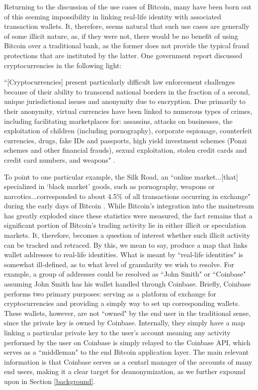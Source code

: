 \documentclass[journal]{IEEEtran}
\begin{document}
Returning to the discussion of the use cases of Bitcoin, many have been born out of this seeming impossibility in linking real-life identity with associated transaction wallets. It, therefore, seems natural that such use cases are generally of some illicit nature, as, if they were not, there would be no benefit of using Bitcoin over a traditional bank, as the former does not provide the typical fraud protections that are instituted by the latter. One government report discussed cryptocurrencies in the following light:

``[Cryptocurrencies] present particularly difficult law enforcement challenges because of their ability to transcend national borders in the fraction of a second, unique jurisdictional issues and anonymity due to encryption. Due primarily to their anonymity, virtual currencies have been linked to numerous types of crimes, including facilitating marketplaces for: assassins, attacks on businesses, the exploitation of children (including pornography), corporate espionage, counterfeit currencies, drugs, fake IDs and passports, high yield investment schemes (Ponzi schemes and other financial frauds), sexual exploitation, stolen credit cards and credit card numbers, and weapons" \cite{virtual-currency}. 

To point to one particular example, the Silk Road, an ``online market...[that] specialized in `black market' goods, such as pornography, weapons or narcotics...corresponded to about 4.5\% of all transactions occurring in exchange" during the early days of Bitcoin \cite{silk}. While Bitcoin's integration into the mainstream has greatly exploded since these statistics were measured, the fact remains that a significant portion of Bitcoin's trading activity lie in either illicit or speculation markets. It, therefore, becomes a question of interest whether such illicit activity can be tracked and retraced. By this, we mean to say, produce a map that links wallet addresses to real-life identities. What is meant by ``real-life identities" is somewhat ill-defined, as to what level of granularity we wish to resolve. For example, a group of addresses could be resolved as ``John Smith" or ``Coinbase" assuming John Smith has his wallet handled through Coinbase. Briefly, Coinbase performs two primary purposes: serving as a platform of exchange for cryptocurrencies and providing a simply way to set up corresponding wallets. These wallets, however, are not ``owned" by the end user in the traditional sense, since the private key is owned by Coinbase. Internally, they simply have a map linking a particular private key to the user's account meaning any activity performed by the user on Coinbase is simply relayed to the Coinbase API, which serves as a ``middleman" to the end Bitcoin application layer. The main relevant information is that Coinbase serves as a centarl manager of the accounts of many end users, making it a clear target for deanonymization, as we further expound upon in Section \ref{background}.
\end{document}

